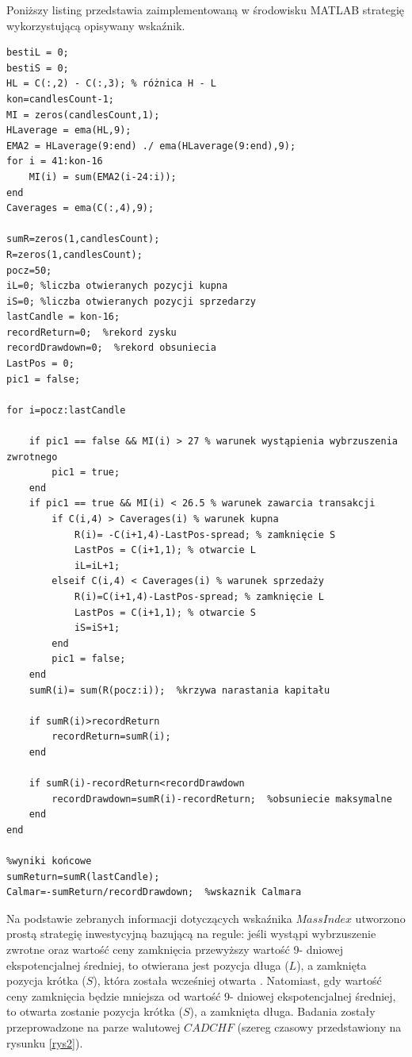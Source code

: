 \noindent Poniższy listing przedstawia zaimplementowaną w środowisku MATLAB strategię wykorzystującą opisywany wskaźnik.
\begin{scriptsize}
\begin{lstlisting}
bestiL = 0;
bestiS = 0;
HL = C(:,2) - C(:,3); % różnica H - L
kon=candlesCount-1;
MI = zeros(candlesCount,1);
HLaverage = ema(HL,9);
EMA2 = HLaverage(9:end) ./ ema(HLaverage(9:end),9);
for i = 41:kon-16
    MI(i) = sum(EMA2(i-24:i));
end
Caverages = ema(C(:,4),9);

sumR=zeros(1,candlesCount);
R=zeros(1,candlesCount);
pocz=50;
iL=0; %liczba otwieranych pozycji kupna
iS=0; %liczba otwieranych pozycji sprzedarzy
lastCandle = kon-16;
recordReturn=0;  %rekord zysku
recordDrawdown=0;  %rekord obsuniecia
LastPos = 0;
pic1 = false;

for i=pocz:lastCandle
    
    if pic1 == false && MI(i) > 27 % warunek wystąpienia wybrzuszenia zwrotnego
        pic1 = true;
    end
    if pic1 == true && MI(i) < 26.5 % warunek zawarcia transakcji
        if C(i,4) > Caverages(i) % warunek kupna
            R(i)= -C(i+1,4)-LastPos-spread; % zamknięcie S
            LastPos = C(i+1,1); % otwarcie L
            iL=iL+1;
        elseif C(i,4) < Caverages(i) % warunek sprzedaży
            R(i)=C(i+1,4)-LastPos-spread; % zamknięcie L
            LastPos = C(i+1,1); % otwarcie S
            iS=iS+1;
        end
        pic1 = false;
    end
    sumR(i)= sum(R(pocz:i));  %krzywa narastania kapitału
    
    if sumR(i)>recordReturn
        recordReturn=sumR(i);
    end
    
    if sumR(i)-recordReturn<recordDrawdown
        recordDrawdown=sumR(i)-recordReturn;  %obsuniecie maksymalne
    end
end

%wyniki końcowe
sumReturn=sumR(lastCandle);
Calmar=-sumReturn/recordDrawdown;  %wskaznik Calmara
\end{lstlisting}
\end{scriptsize}


Na podstawie zebranych informacji dotyczących wskaźnika $Mass Index$ utworzono prostą strategię inwestycyjną bazującą na regule: jeśli wystąpi wybrzuszenie zwrotne oraz wartość ceny zamknięcia przewyższy wartość 9- dniowej ekspotencjalnej średniej, to otwierana jest pozycja długa ($L$), a zamknięta pozycja krótka ($S$), która została wcześniej otwarta . Natomiast, gdy wartość ceny zamknięcia będzie mniejsza od wartość 9- dniowej ekspotencjalnej średniej, to otwarta zostanie pozycja krótka ($S$), a zamknięta długa. Badania zostały przeprowadzone na parze walutowej $CADCHF$ (szereg czasowy przedstawiony na rysunku \ref{rys2}). \\

